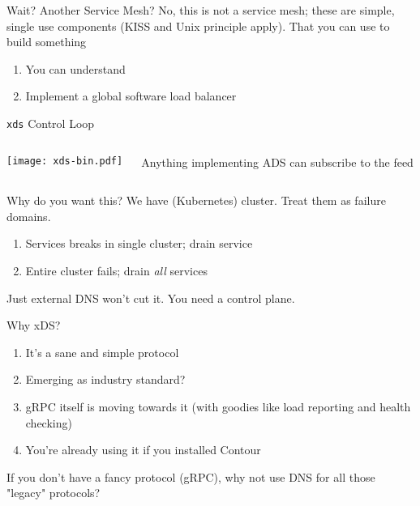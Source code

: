 \documentclass[aspectratio=169]{beamer}
\begin{document}
    \begin{frame}{Wait? Another Service Mesh?}
        No, this is not a service mesh; these are simple, single use components (KISS and Unix principle apply). That you can use
        to build something
        \begin{enumerate}
            \item You can understand
            \item Implement a global software load balancer
        \end{enumerate}
    \end{frame}


    \begin{frame}[plain]{\texttt{xds} Control Loop}
        \begin{columns}
            \begin{column}{0.5\textwidth}
                \texttt{[image: xds-bin.pdf]}
            \end{column}
            \begin{column}{0.5\textwidth}
                Anything implementing ADS can subscribe to the feed
            \end{column}
        \end{columns}
    \end{frame}

    \begin{frame}{Why do you want this?}
        We have (Kubernetes) cluster. Treat them as failure domains.
        \begin{enumerate}
            \item Services breaks in single cluster; drain service
            \item Entire cluster fails; drain \emph{all} services
        \end{enumerate}
        Just external DNS won't cut it. You need a control plane.
    \end{frame}

    \begin{frame}{Why xDS?}
        \begin{enumerate}
            \item It's a sane and simple protocol
            \item Emerging as industry standard?
            \item gRPC itself is moving towards it (with goodies like load reporting and health checking)
            \item You're already using it if you installed Contour
        \end{enumerate}
        If you don't have a fancy protocol (gRPC), why not use DNS for all those "legacy" protocols?
    \end{frame}
\end{document}
